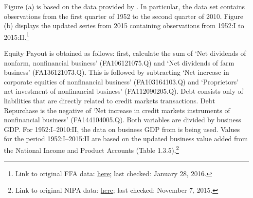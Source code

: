 \documentclass[12pt,a4paper,leqno]{article}
\begin{document}
Figure (a) is based on the data provided by \citeauthor{JERMANNfinancial}. In particular, the data set contains observations from the first quarter of 1952 to the second quarter of 2010. Figure (b) displays the updated series from 2015 containing observations from 1952:I to 2015:II.\footnote{Link to original FFA data: \href{http://www.federalreserve.gov/datadownload/Download.aspx?rel=Z1&series=1b491b6891f88f8604172bc2f3970d52&from=03/01/1952&to=06/30/2015&lastObs=&filetype=spreadsheetml&label=include&layout=seriescolumn}{here}; last checked: January 28, 2016.}

Equity Payout is obtained as follows: first, calculate the sum of ‘Net dividends of nonfarm, nonfinancial business’ (FA106121075.Q) and ‘Net dividends of farm business’ (FA136121073.Q). This is followed by subtracting ‘Net increase in corporate equities of nonfinancial business’ (FA103164103.Q) and ‘Proprietors’ net investment of nonfinancial business’ (FA112090205.Q). Debt consists only of liabilities that are directly related to credit markets transactions.  Debt Repurchase is the negative of ‘Net increase in credit markets instruments of nonfinancial business’ (FA144104005.Q).
Both variables are divided by business GDP. For 1952:I--2010:II, the data on business GDP from \citeauthor{JERMANNfinancial} is being used. Values for the period 1952:I--2015:II are based on the updated business value added from the National Income and Product Accounts (Table 1.3.5).\footnote{Link to original NIPA data: \href{http://www.bea.gov//national/nipaweb/DownSS2.asp}{here}; last checked: November 7, 2015.} 


\vfill
{}




\end{document}
